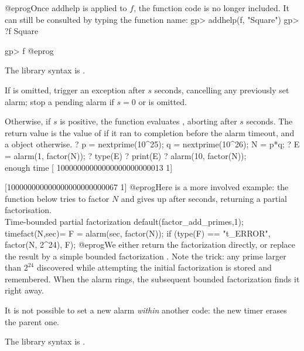 @eprog\noindent Once addhelp is applied to $f$, the function code is no
longer included. It can still be consulted by typing the function name:
\bprog
gp> addhelp(f, "Square")
gp> ?f
Square

gp> f
@eprog

The library syntax is .

\label{se:alarm}
If  is omitted, trigger an  exception after $s$
seconds, cancelling any previously set alarm; stop a pending alarm if $s =
0$ or is omitted.

Otherwise, if $s$ is positive, the function evaluates ,
aborting after $s$ seconds. The return value is the value of  if
it ran to completion before the alarm timeout, and a  object
otherwise.
\bprog
  ? p = nextprime(10^25); q = nextprime(10^26); N = p*q;
  ? E = alarm(1, factor(N));
  ? type(E)
  ? print(E)
  ? alarm(10, factor(N));   \\ enough time
  [ 10000000000000000000000013 1]

  [100000000000000000000000067 1]
@eprog\noindent Here is a more involved example: the function
 below tries to factor $N$ and gives up after 
seconds, returning a partial factorisation.
\bprog
\\ Time-bounded partial factorization
default(factor_add_primes,1);
timefact(N,sec)=
{
  F = alarm(sec, factor(N));
  if (type(F) == "t_ERROR", factor(N, 2^24), F);
}
@eprog\noindent We either return the factorization directly, or replace the
 result by a simple bounded factorization .
Note the  trick: any prime larger than $2^{24}$
discovered while attempting the initial factorization is stored and
remembered. When the alarm rings, the subsequent bounded factorization finds
it right away.

 It is not possible to set a new alarm \emph{within}
another  code: the new timer erases the parent one.

The library syntax is .

